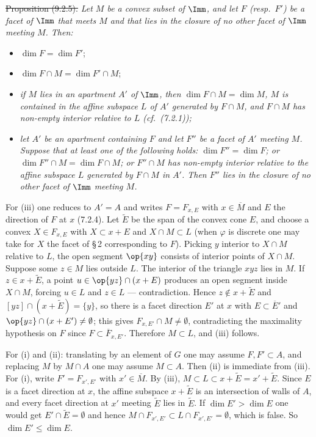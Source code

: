 \documentclass[12pt,a4paper,oneside,english]{smfart}
\theoremstyle{definition}
\theoremstyle{bt}
\begin{document}
\st{Proposition (9.2.5).}
\emph{Let $M$ be a convex subset of $\Imm$, and let $F$ (resp.\ $F'$) be a facet
of $\Imm$ that meets $M$ and that lies in the closure of no other facet of
$\Imm$ meeting $M$. Then:}
\begin{itemize}
\item[(i)] $\dim F=\dim F'$;
\item[(ii)] $\dim F\cap M=\dim F'\cap M$;
\item[(iii)] \emph{if $M$ lies in an apartment $A'$ of $\Imm$, then
$\dim F\cap M=\dim M$, $M$ is contained in the affine subspace $L$ of $A'$
generated by $F\cap M$, and $F\cap M$ has non-empty interior relative to $L$
(cf.\ (7.2.1));}
\item[(iv)] \emph{let $A'$ be an apartment containing $F$ and let $F''$ be a
facet of $A'$ meeting $M$. Suppose that at least one of the following holds:
$\dim F''=\dim F$; or $\dim F''\cap M=\dim F\cap M$; or $F''\cap M$ has
non-empty interior relative to the affine subspace $L$ generated by $F\cap M$ in
$A'$. Then $F''$ lies in the closure of no other facet of $\Imm$ meeting $M$.}
\end{itemize}

\pf
For (iii) one reduces to $A'=A$ and writes $F=F_{x,E}$ with $x\in\overline M$
and $E$ the direction of $F$ at $x$ (7.2.4). Let $\widetilde E$ be the span of
the convex cone $E$, and choose a convex $X\in F_{x,E}$ with $X\subset x+E$ and
$X\cap M\subset L$ (when $\varphi$ is discrete one may take for $X$ the facet of
\S\,2 corresponding to $F$). Picking $y$ interior to $X\cap M$ relative to $L$,
the open segment $\op{xy}$ consists of interior points of $X\cap M$. Suppose
some $z\in M$ lies outside $L$. The interior of the triangle $xyz$ lies in $M$.
If $z\in x+\widetilde E$, a point $u\in\op{yz}\cap(x+E)$ produces an open
segment inside $X\cap M$, forcing $u\in L$ and $z\in L$ --- contradiction. Hence
$z\notin x+\widetilde E$ and $[yz]\cap(x+\widetilde E)=\{y\}$, so there is a
facet direction $E'$ at $x$ with $E\subset\overline{E}'$ and
$\op{yz}\cap(x+E')\neq\emptyset$; this gives $F_{x,E'}\cap M\neq\emptyset$,
contradicting the maximality hypothesis on $F$ since $F\subset\overline
F_{x,E'}$. Therefore $M\subset L$, and (iii) follows.

For (i) and (ii): translating by an element of $G$ one may assume
$F,F'\subset A$, and replacing $M$ by $M\cap A$ one may assume $M\subset A$.
Then (ii) is immediate from (iii). For (i), write $F'=F_{x',E'}$ with
$x'\in\overline M$. By (iii), $M\subset L\subset x+\widetilde E=x'+\widetilde E$.
Since $E$ is a facet direction at $x$, the affine subspace $x+\widetilde E$ is
an intersection of walls of $A$, and every facet direction at $x'$ meeting
$\widetilde E$ lies in $\widetilde E$. If $\dim E'>\dim E$ one would get
$E'\cap\widetilde E=\emptyset$ and hence
$M\cap F_{x',E'}\subset L\cap F_{x',E'}=\emptyset$, which is false. So
$\dim E'\le\dim E$.
\end{document}
